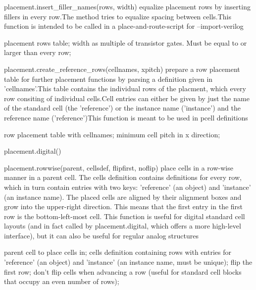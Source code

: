 \begin{APIfunc}{placement.insert\_filler\_names(rows, width)}
    equalize placement rows by inserting fillers in every row.The method tries to equalize spacing between cells.This function is intended to be called in a place-and-route-script for --import-verilog
    \begin{APIparameters}
            placement rows table;
            width as multiple of transistor gates. Must be equal to or larger than every row;
    \end{APIparameters}
\end{APIfunc}
\begin{APIfunc}{placement.create\_reference\_rows(cellnames, xpitch)}
    prepare a row placement table for further placement functions by parsing a definition given in 'cellnames'.This table contains the individual rows of the placment, which every row consiting of individual cells.Cell entries can either be given by just the name of the standard cell (the 'reference') or the instance name ('instance') and the reference name ('reference')This function is meant to be used in pcell definitions
    \begin{APIparameters}
            row placement table with cellnames;
            minimum cell pitch in x direction;
    \end{APIparameters}
\end{APIfunc}
\begin{APIfunc}{placement.digital()}
    
    \begin{APIparameters}
    \end{APIparameters}
\end{APIfunc}
\begin{APIfunc}{placement.rowwise(parent, cellsdef, flipfirst, noflip)}
    place cells in a row-wise manner in a parent cell. The cells definition contains definitions for every row, which in turn contain entries with two keys: 'reference' (an object) and 'instance' (an instance name). The placed cells are aligned by their alignment boxes and grow into the upper-right direction. This means that the first entry in the first row is the bottom-left-most cell. This function is useful for digital standard cell layouts (and in fact called by placement.digital, which offers a more high-level interface), but it can also be useful for regular analog structures
    \begin{APIparameters}
            parent cell to place cells in;
            cells definition containing rows with entries for 'reference' (an object) and 'instance' (an instance name, must be unique);
            flip the first row;
            don't flip cells when advancing a row (useful for standard cell blocks that occupy an even number of rows);
    \end{APIparameters}
\end{APIfunc}
